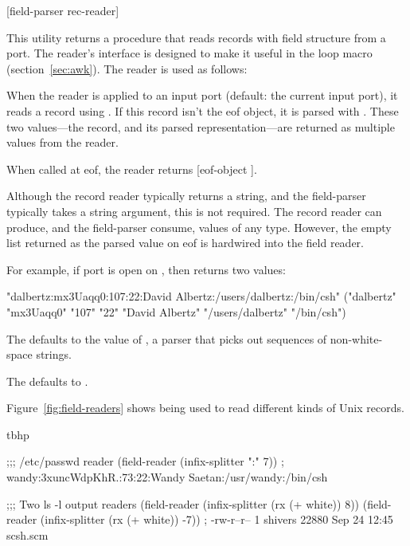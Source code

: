  {[field-parser rec-reader]} \proc
\begin{desc}    
    This utility returns a procedure that reads records with field structure 
    from a port.
    The reader's interface is designed to make it useful in the 
            loop macro (section~\ref{sec:awk}).
    The reader is used as follows:
    
    When the reader is applied to an input port (default: the current
    input port), it reads a record using . If this record isn't
    the eof object, it is parsed with . These two 
    values---the record, and its parsed representation---are returned
    as multiple values from the reader.
    
    When called at eof, the reader returns [eof-object \ex{()}].
    
    Although the record reader typically returns a string, and
    the field-parser typically takes a string argument, this is not
    required. The record reader can produce, and the field-parser consume,
    values of any type. However, the empty list returned as the
    parsed value on eof is hardwired into the field reader.

    For example, if port  is open on , then
    returns two values:
{\small
\begin{widecode}
"dalbertz:mx3Uaqq0:107:22:David Albertz:/users/dalbertz:/bin/csh"
("dalbertz" "mx3Uaqq0" "107" "22" "David Albertz" "/users/dalbertz"
            "/bin/csh")\end{widecode}}
    The  defaults to the value of ,
    a parser that picks out sequences of non-white-space strings.

    The  defaults to .
      
    Figure~\ref{fig:field-readers} shows  being
    used to read different kinds of Unix records.

\begin{boxedfigure}{tbhp}
\begin{centercode}
;;; /etc/passwd reader
(field-reader (infix-splitter ":" 7))
    ; wandy:3xuncWdpKhR.:73:22:Wandy Saetan:/usr/wandy:/bin/csh

;;; Two ls -l output readers
(field-reader (infix-splitter (rx (+ white)) 8))
(field-reader (infix-splitter (rx (+ white)) -7))
    ; -rw-r--r--  1 shivers    22880 Sep 24 12:45 scsh.scm


\end{centercode}
\end{boxedfigure}
\end{desc}
